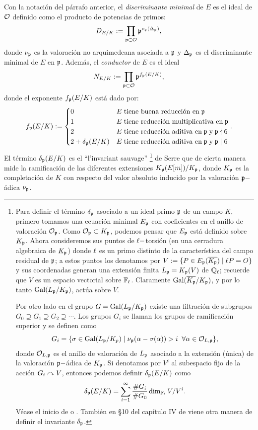 \begin{defin}\label{def:conductor}
	Con la notación del párrafo anterior, el \emph{discriminante minimal} de $E$ es el ideal de $\mathcal{O}$ definido como el producto de potencias de primos:
	\[
		D_{E/K}:=\prod_{\mathfrak{p}\subset\mathcal{O}}\mathfrak{p}^{\nu_{\mathfrak{p}}(\Delta_{\mathfrak{p}})},
	\]
	donde $\nu_{\mathfrak{p}}$ es la valoración no arquimedeana asociada a $\mathfrak{p}$ y $\Delta_{\mathfrak{p}}$ es el discriminante minimal de $E$ en $\mathfrak{p}$. Además, el \emph{conductor} de $E$ es el ideal
	\[
		N_{E/K}:=\prod_{\mathfrak{p}\subset\mathcal{O}}\mathfrak{p}^{f_{\mathfrak{p}}(E/K)},
	\]
	donde el exponente $f_{\mathfrak{p}}(E/K)$ está dado por:
	\[
		f_{\mathfrak{p}}(E/K):=
		\begin{cases}
			0 & E\;\text{tiene buena reducción en}\;\mathfrak{p}\\
			1 & E\;\text{tiene reducción multiplicativa en}\;\mathfrak{p}\\
			2 & E\;\text{tiene reducción aditiva en}\;\mathfrak{p}\;\text{y}\; \mathfrak{p}\nmid 6\\
			2+\delta_{\mathfrak{p}}(E/K) & E\;\text{tiene reducción aditiva en}\;\mathfrak{p}\;\text{y}\; \mathfrak{p}\mid 6
		\end{cases}.
	\]
	El término $\delta_{\mathfrak{p}}(E/K)$ es el ``l'invariant sauvage'' \footnote{Para definir el término $\delta_{\mathfrak{p}}$ asociado a un ideal primo $\mathfrak{p}$ de un campo $K$, primero tomamos una ecuación minimal $E_{\mathfrak{p}}$ con coeficientes en el anillo de valoración $\mathcal{O}_{\mathfrak{p}}$. Como $\mathcal{O}_{\mathfrak{p}}\subset K_{\mathfrak{p}}$, podemos pensar que $E_{\mathfrak{p}}$ está definido sobre $K_{\mathfrak{p}}$. Ahora consideremos sus puntos de $\ell-$torsión (en una cerradura algebraica de $K_{\mathfrak{p}}$) donde $\ell$ es un primo distinto de la característica del campo residual de $\mathfrak{p}$; a estos puntos los denotamos por $V:=\{P\in E_{\mathfrak{p}}(\overline{K_{\mathfrak{p}}})\mid \ell P=O\}$ y sus coordenadas generan una extensión finita $L_{\mathfrak{p}}=K_{\mathfrak{p}}(V)$ de $\mathbb{Q}_\ell$; recuerde que $V$ es un espacio vectorial sobre $\mathbb{F}_\ell$. Claramente $\mathrm{Gal}(\overline{K_{\mathfrak{p}}}/K_{\mathfrak{p}})$, y por lo tanto $\mathrm{Gal}(L_{\mathfrak{p}}/K_{\mathfrak{p}})$, actúa sobre $V$.

Por otro lado en el grupo $G=\mathrm{Gal}(L_{\mathfrak{p}}/K_{\mathfrak{p}})$ existe una filtración de subgrupos $G_0\supseteq G_1\supseteq G_2\supseteq\cdots$. Los grupos $G_i$ se llaman los grupos de ramificación superior y se definen como
\[
	G_i=\{\sigma\in\mathrm{Gal}(L_{\mathfrak{p}}/K_p)\mid \nu_{\mathfrak{p}}(\alpha-\sigma(\alpha))>i\;\;\forall\alpha\in\mathcal{O}_{L,\mathfrak{p}}\},
\]
donde $\mathcal{O}_{L,\mathfrak{p}}$ es el anillo de valoración de $L_{\mathfrak{p}}$ asociado a la extensión (única) de la valoración $\mathfrak{p}-$ádica de $K_{\mathfrak{p}}$. Si denotamos por $V^i$ al subespacio fijo de la acción $G_i\curvearrowright V$, entonces podemos definir $\delta_{\mathfrak{p}}(E/K)$ como
\[
	\delta_{\mathfrak{p}}(E/K)=\sum_{i=1}^\infty\frac{\# G_i}{\#G_0}\dim_{\mathbb{F}_\ell}V/V^i.
\]
Véase el inicio de \cite{Serre87} o \cite[\S19.3]{SerreLF}. También en \S10 del capítulo IV de \cite{SilvermanATITAOEC} viene otra manera de definir el invariante $\delta_{\mathfrak{p}}$.} de Serre que de cierta manera mide la ramificación de las diferentes extensiones $K_{\mathfrak{p}}(E[m])/K_{\mathfrak{p}}$, donde $K_{\mathfrak{p}}$ es la completación de $K$ con respecto del valor absoluto inducido por la valoración $\mathfrak{p}-$ádica $\nu_{\mathfrak{p}}$.
\end{defin}


